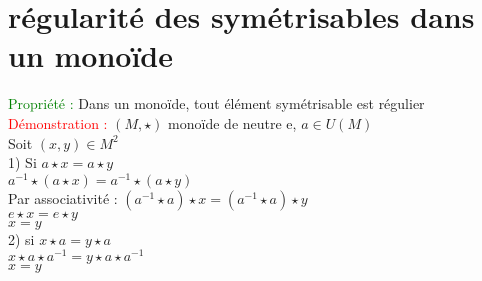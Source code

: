\documentclass{article}
\begin{document}
	\section{régularité des symétrisables dans un monoïde}
	\textcolor{green}{Propriété :} Dans un mono\"ide, tout \'el\'ement sym\'etrisable est r\'egulier \\
	\textcolor{red}{Démonstration :} $(M,\star)$ mono\"ide de neutre e, $a \in U(M)$ \\
	\indent Soit $(x,y) \in M^2$ \\
	1) Si $a \star x = a \star y$ \\
	\indent $a^{-1} \star ( a \star x)= a^{-1} \star ( a \star y)$ \\
	\indent Par associativit\'e : $(a^{-1} \star a) \star x = (a^{-1} \star a) \star y$ \\
	 \indent $e \star x = e \star y$ \\
	\indent $x=y$ \\
2) si $x \star a = y \star a$ \\
\indent $ x \star a \star a^{-1}=y \star a \star a^{-1}$ \\
\indent $x=y$
\end{document}
